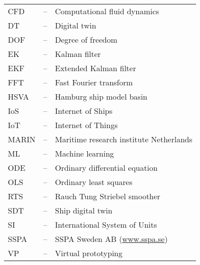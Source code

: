 
\begin{tabular}{ l c l }
CFD & -- & Computational fluid dynamics\\
DT  & -- & Digital twin\\
DOF & -- & Degree of freedom\\
EK & -- & Kalman filter \\
EKF & -- & Extended Kalman filter \\
FFT & -- & Fast Fourier transform\\
HSVA & -- & Hamburg ship model basin \\
IoS & -- & Internet of Ships \\
IoT & -- & Internet of Things \\
MARIN & -- & Maritime research institute Netherlands \\
ML & -- & Machine learning \\
ODE & -- & Ordinary differential equation\\
OLS & -- & Ordinary least squares\\
RTS & -- & Rauch Tung Striebel smoother \\
SDT  & -- & Ship digital twin\\
SI  & -- & International System of Units\\
SSPA & -- & SSPA Sweden AB (\url{www.sspa.se})\\
VP & -- & Virtual prototyping \\
\end{tabular}
